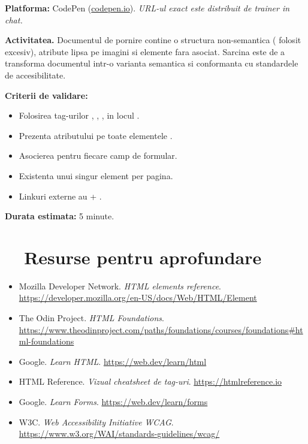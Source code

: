 \partdivider

\begin{joc}
\textbf{Platforma:} CodePen (\url{codepen.io}). \quad \textit{URL-ul exact este distribuit de trainer in chat.}

\medskip

\textbf{Activitatea.} Documentul de pornire contine o structura non-semantica ( folosit excesiv), atribute  lipsa pe imagini si elemente  fara  asociat. Sarcina este de a transforma documentul intr-o varianta semantica si conformanta cu standardele de accesibilitate.

\medskip

\textbf{Criterii de validare:}
\begin{itemize}[itemsep=1pt]
  \item Folosirea tag-urilor , , ,  in locul .
  \item Prezenta atributului  pe toate elementele .
  \item Asocierea  \textendash{}  pentru fiecare camp de formular.
  \item Existenta unui singur element  per pagina.
  \item Linkuri externe au  + .
\end{itemize}

\medskip

\textbf{Durata estimata:} 5 minute.
\end{joc}

\section*{\faGraduationCap\ \ Resurse pentru aprofundare}

\begin{itemize}[itemsep=2pt]
  \item Mozilla Developer Network. \emph{HTML elements reference}. \\\url{https://developer.mozilla.org/en-US/docs/Web/HTML/Element}
  \item The Odin Project. \emph{HTML Foundations}. \\\url{https://www.theodinproject.com/paths/foundations/courses/foundations\#html-foundations}
  \item Google. \emph{Learn HTML}. \url{https://web.dev/learn/html}
  \item HTML Reference. \emph{Vizual cheatsheet de tag-uri}. \url{https://htmlreference.io}
  \item Google. \emph{Learn Forms}. \url{https://web.dev/learn/forms}
  \item W3C. \emph{Web Accessibility Initiative \textendash{} WCAG}. \url{https://www.w3.org/WAI/standards-guidelines/wcag/}
\end{itemize}

\bigskip

